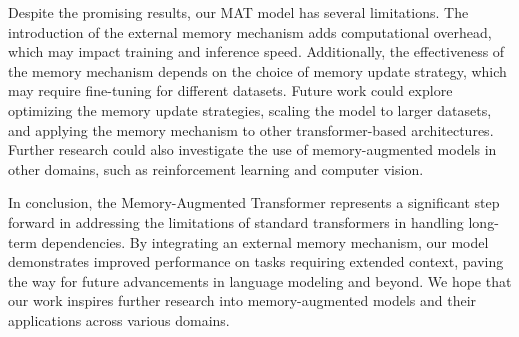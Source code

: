 \documentclass{article} %
\begin{document}
Despite the promising results, our MAT model has several limitations. The introduction of the external memory mechanism adds computational overhead, which may impact training and inference speed. Additionally, the effectiveness of the memory mechanism depends on the choice of memory update strategy, which may require fine-tuning for different datasets. Future work could explore optimizing the memory update strategies, scaling the model to larger datasets, and applying the memory mechanism to other transformer-based architectures. Further research could also investigate the use of memory-augmented models in other domains, such as reinforcement learning and computer vision.

In conclusion, the Memory-Augmented Transformer represents a significant step forward in addressing the limitations of standard transformers in handling long-term dependencies. By integrating an external memory mechanism, our model demonstrates improved performance on tasks requiring extended context, paving the way for future advancements in language modeling and beyond. We hope that our work inspires further research into memory-augmented models and their applications across various domains.



\end{document}
